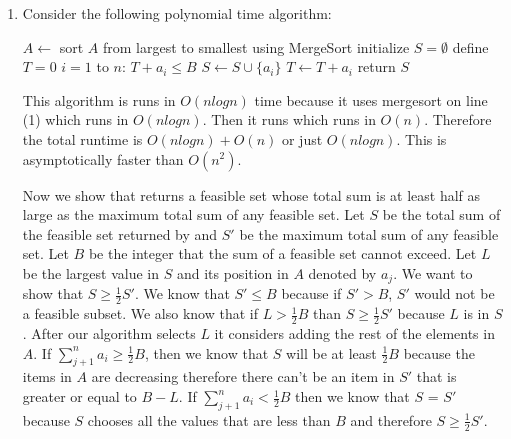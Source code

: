 \documentclass[11pt]{article}
\begin{document}
\begin{enumerate}
\begin{enumerate}
        \item Consider the following polynomial time algorithm:
        
        \begin{codebox}
            \li $A \leftarrow$ sort $A$ from largest to smallest using MergeSort
            \li initialize $S = \emptyset$
            \li define $T=0$
            \li \For $i=1$ to $n$: \Do
            \li \If $T + a_i \leq B$ \Then
            \li $S \gets S \cup \{a_i\}$
            \li $T \gets T + a_i$
            \End %
            \End %
            \li return $S$
        \end{codebox}
        This algorithm is runs in $O(n logn)$ time because it uses mergesort on line (1) which runs in $O(n logn)$.  Then it runs  which runs in $O(n)$.  Therefore the total runtime is $O(n logn) + O(n)$ or just $O(n logn)$.  This is asymptotically faster than $O(n^2)$.
        
        Now we show that  returns a feasible set whose total sum is at least half as large as the maximum total sum of any feasible set.
        Let $S$ be the total sum of the feasible set returned by  and $S'$ be the maximum total sum of any feasible set.  Let $B$ be the integer that the sum of a feasible set cannot exceed.  Let $L$ be the largest value in $S$ and its position in $A$ denoted by $a_j$.  We want to show that $S \geq \frac{1}{2}S'$.  We know that $S' \leq B$ because if $S' > B$, $S'$ would not be a feasible subset. We also know that if $L > \frac{1}{2}B$ than $S \geq \frac{1}{2}S'$ because $L$ is in $S$.  After our algorithm selects $L$ it considers adding the rest of the elements in $A$.  If $\sum_{j+1}^{n}a_i \geq \frac{1}{2}B$, then we know that $S$ will be at least $\frac{1}{2}B$ because the items in $A$ are decreasing therefore there can't be an item in $S'$ that is greater or equal to $B-L$.  If $\sum_{j+1}^{n}a_i < \frac{1}{2}B$ then we know that $S$ = $S'$ because $S$ chooses all the values that are less than $B$ and therefore $S \geq \frac{1}{2}S'$. 
    \end{enumerate}


\end{enumerate}
\end{document}
